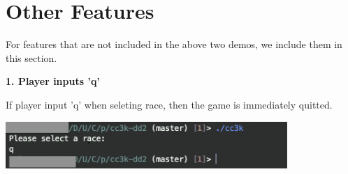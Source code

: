 \documentclass[11pt]{article}
\theoremstyle{plain}
\begin{document}
\newpage
\section{Other Features}

For features that are not included in the above two demos, we include them
in this section.



\vspace{0.2in}
\textbf{1. Player inputs 'q'}

If player input 'q' when seleting race, then the game is immediately quitted.
\begin{center}
\includegraphics[width=0.8\textwidth]{quit.png}
\end{center}

\vspace{0.5 in}
\end{document}
